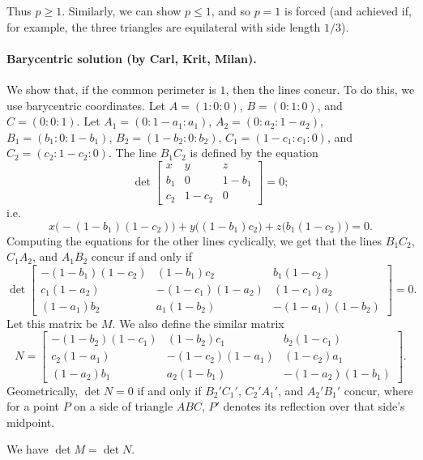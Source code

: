 \documentclass[11pt]{scrartcl}
\begin{document}
Thus $p \ge 1$. Similarly, we can show $p \le 1$,
and so $p = 1$ is forced (and achieved if, for example,
the three triangles are equilateral with side length $1/3$).

\paragraph{Barycentric solution (by Carl, Krit, Milan).}
We show that, if the common perimeter is $1$, then the lines concur.
To do this, we use barycentric coordinates.
Let $A=(1:0:0)$, $B=(0:1:0)$, and $C=(0:0:1)$.
Let $A_1=(0:1-a_1:a_1)$, $A_2=(0:a_2:1-a_2)$,
$B_1=(b_1:0:1-b_1)$, $B_2=(1-b_2:0:b_2)$,
$C_1=(1-c_1:c_1:0)$, and $C_2=(c_2:1-c_2:0)$.
The line $B_1C_2$ is defined by the equation
\[ \det \begin{bmatrix}
    x & y & z \\
    b_1 & 0 & 1-b_1\\
    c_2 & 1-c_2 & 0
  \end{bmatrix} = 0; \]
i.e.
\[ x\big(-(1-b_1)(1-c_2)\big)
  + y\big((1-b_1)c_2\big)
  + z\big(b_1(1-c_2)\big) = 0. \]
Computing the equations for the other lines cyclically,
we get that the lines $B_1C_2$, $C_1A_2$, and $A_1B_2$ concur if and only if
\[ \det \begin{bmatrix}
    -(1-b_1)(1-c_2) & (1-b_1)c_2 & b_1(1-c_2)\\
    c_1(1-a_2) & -(1-c_1)(1-a_2) & (1-c_1)a_2\\
    (1-a_1)b_2 & a_1(1-b_2) & -(1-a_1)(1-b_2)
  \end{bmatrix} = 0.
\]
Let this matrix be $M$.
We also define the similar matrix
\[ N = \begin{bmatrix}
    -(1-b_2)(1-c_1) & (1-b_2)c_1 & b_2(1-c_1)\\
    c_2(1-a_1) & -(1-c_2)(1-a_1) & (1-c_2)a_1\\
    (1-a_2)b_1 & a_2(1-b_1) & -(1-a_2)(1-b_1)
  \end{bmatrix}. \]
Geometrically, $\det N=0$ if and only if
$B_2'C_1'$, $C_2'A_1'$, and $A_2'B_1'$ concur,
where for a point $P$ on a side of triangle $ABC$,
$P'$ denotes its reflection over that side's midpoint.
\begin{claim*}
  We have $\det M = \det N$.
\end{claim*}
\end{document}
